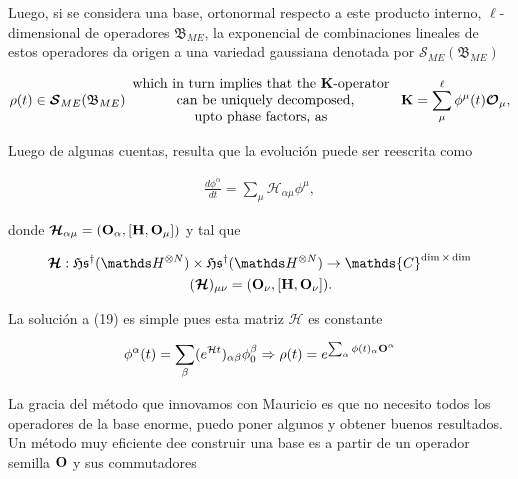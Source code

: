 \documentclass{homework}
\begin{document}
Luego, si se considera una base, ortonormal respecto a este producto interno, $\ell$-dimensional de operadores $\mathfrak{B}_{ME}$, la exponencial de combinaciones lineales de estos operadores da origen a una variedad gaussiana denotada por $\bm{\mathcal{S}}_{ME}( \mathfrak{B}_{ME})$

\begin{equation}
    \rho(t) \in \bm{\mathcal{S}}_{ME}( \mathfrak{B}_{ME}) \begin{array}{c}
         \textnormal{which in turn implies that the ${\bf K}$-operator } \\
         \textnormal{ can be uniquely decomposed,} \\
         \textnormal{upto phase factors, as } 
    \end{array}
    {\bf K} = \sum_{\mu}^{\ell} \phi^{\mu}(t) \bm{\mathcal{O}}_{\mu},
\end{equation}

Luego de algunas cuentas, resulta que la evolución puede ser reescrita como

\begin{equation}
        \begin{split} {\frac{d\phi^{\alpha}}{dt}}{= \sum_{\mu} \bm{\mathcal{H}}_{\alpha \mu} \phi^{\mu}},
            \end{split}
    \end{equation}

donde $\bm{\mathcal{H}}_{\alpha \mu} = ({\bf O}_\alpha, [{\bf H}, {\bf O}_{\mu}])$ y tal que 

\begin{align*}
    \bm{\mathcal{H}} : \mathfrak{H}\mathfrak{s}^\dagger(\hilbert^{\otimes N}) & \times \mathfrak{H}\mathfrak{s}^\dagger(\hilbert^{\otimes N}) \rightarrow \mathds{C}^{\dim \times \dim} \\
    & (\bm{\mathcal{H}})_{\mu \nu} = ({\bf O}_{\nu}, [{\bf H}, {\bf O}_{\nu}]).
\end{align*}

La solución a (19) es simple pues esta matriz $\bm{\mathcal{H}}$ es constante

$$
\phi^\alpha(t) = \sum_{\beta} (e^{\mathcal{H} t})_{\alpha \beta} \phi_0^\beta \Rightarrow \rho(t) = e^{\sum_{\alpha} \phi(t)_{\alpha} {\bf O}^\alpha}
$$

La gracia del método que innovamos con Mauricio es que no necesito todos los operadores de la base enorme, puedo poner algunos y obtener buenos resultados. Un método muy eficiente dee construir una base es a partir de un operador semilla ${\bf O}$ y sus commutadores
\end{document}
